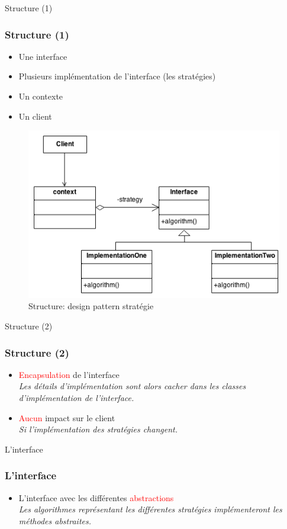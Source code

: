 \documentclass{beamer}
\begin{document}
  \begin{frame}{Structure (1)}
    \frametitle{Structure (1)}
    \begin{itemize}
      \item Une interface
      \item Plusieurs implémentation de l'interface (les stratégies)
      \item Un contexte
      \item Un client
    \end{itemize}
    \begin{figure}[!b]
      \centering
      \includegraphics[scale=0.27]{Strategy}
      \caption{Structure: design pattern stratégie}
    \end{figure}
  \end{frame}
  
    \begin{frame}{Structure (2)}
    \frametitle{Structure (2)}
    \begin{itemize}
      \item \textcolor{red}{Encapsulation} de l'interface \\
      \textit{Les détails d'implémentation sont alors cacher dans les classes d'implémentation de l'interface.}
      \item \textcolor{red}{Aucun} impact sur le client \\
      \textit{Si l'implémentation des stratégies changent.}
    \end{itemize}
        
  \end{frame}

  \begin{frame}{L'interface}
    \frametitle{L'interface}
    \begin{itemize}
      \item L'interface avec les différentes \textcolor{red}{abstractions} \\
      \textit{Les algorithmes représentant les différentes stratégies implémenteront les méthodes abstraites.}
    \end{itemize}
        
  \end{frame}
\end{document}
